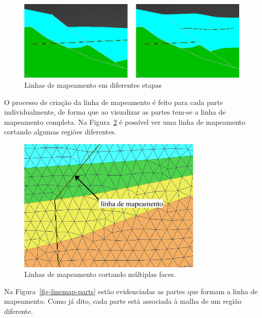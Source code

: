 \begin{figure} [h]
  \begin{center}
    \includegraphics[width=420pt]{images/fig-linemap-history}
    \caption{Linhas de mapeamento em diferentes etapas}\label{fig-linemap-history}
  \end{center}
\end{figure}


O processo de criação da linha de mapeamento é feito para cada parte individualmente, de forma que ao visualizar as partes tem-se a linha de mapeamento completa. Na Figura~\ref{fig-linemap-malhas} é possível ver uma linha de mapeamento cortando algumas regiões diferentes.

\begin{figure} [h]
  \begin{center}
    \includegraphics[width=250pt]{images/fig-linhas-de-mapeamento-malhas}
    \caption{Linhas de mapeamento cortando múltiplas faces.}\label{fig-linemap-malhas}
  \end{center}
\end{figure}

Na Figura~\ref{fig-linemap-parts} estão evidenciadas as partes que formam a linha de mapeamento. Como já dito, cada parte está associada à malha de um região diferente.

